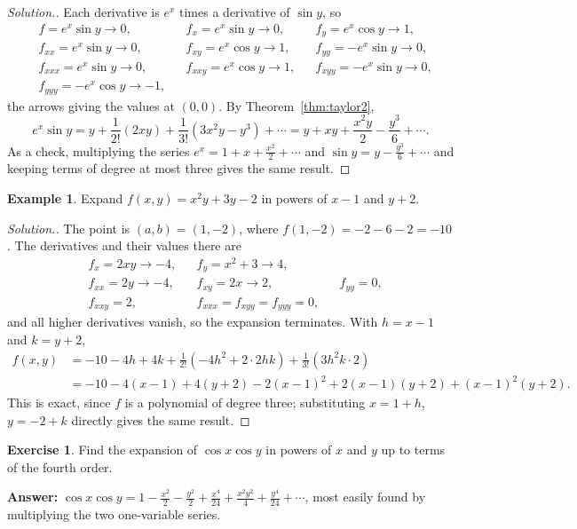 \documentclass[11pt,a4paper]{article}
\theoremstyle{definition}
\newtheorem{exa}[thm]{Example}
\newtheorem{exe}[thm]{Exercise}
\newenvironment{solution}
  {\renewcommand{\qedsymbol}{}\begin{proof}[\textit{Solution}.]}
  {\end{proof}}
\begin{document}
\begin{solution}
Each derivative is $e^x$ times a derivative of $\sin y$, so
\begin{align*}
& f = e^x\sin y \to 0, && f_x = e^x\sin y \to 0, && f_y = e^x\cos y \to 1,\\
& f_{xx} = e^x\sin y \to 0, && f_{xy} = e^x\cos y \to 1, && f_{yy} = -e^x\sin y
\to 0,\\
& f_{xxx} = e^x\sin y \to 0, && f_{xxy} = e^x\cos y \to 1, && f_{xyy} = -e^x\sin y
\to 0,\\
& f_{yyy} = -e^x\cos y \to -1,
\end{align*}
the arrows giving the values at $(0,0)$. By Theorem~\ref{thm:taylor2},
\[e^x\sin y = y + \frac{1}{2!}(2xy) + \frac{1}{3!}(3x^2y - y^3) + \cdots = y + xy
+ \frac{x^2y}{2} - \frac{y^3}{6} + \cdots .\]
As a check, multiplying the series $e^x = 1 + x + \frac{x^2}{2}+\cdots$ and
$\sin y = y - \frac{y^3}{6}+\cdots$ and keeping terms of degree at most three
gives the same result.
\end{solution}

\begin{exa}
\label{ex:taylorpoly}
Expand $f(x,y) = x^2y + 3y -2$ in powers of $x - 1$ and $y + 2$.
\end{exa}

\begin{solution}
The point is $(a,b) = (1,-2)$, where $f(1,-2) = -2 - 6 - 2 = -10$. The
derivatives and their values there are
\begin{align*}
& f_x = 2xy \to -4, && f_y = x^2 + 3 \to 4,\\
& f_{xx} = 2y \to -4, && f_{xy} = 2x \to 2, && f_{yy} = 0,\\
& f_{xxy} = 2, && f_{xxx} = f_{xyy} = f_{yyy} = 0 ,
\end{align*}
and all higher derivatives vanish, so the expansion terminates. With $h = x - 1$
and $k = y + 2$,
\begin{align*}
f(x,y) & = -10 - 4h + 4k + \frac{1}{2!}\left(-4h^2 + 2\cdot 2hk\right) +
\frac{1}{3!}\left(3h^2k\cdot 2\right)\\
& = -10 - 4(x-1) + 4(y+2) - 2(x-1)^2 + 2(x-1)(y+2) + (x-1)^2(y+2) .
\end{align*}
This is exact, since $f$ is a polynomial of degree three; substituting
$x = 1 + h$, $y = -2 + k$ directly gives the same result.
\end{solution}

\begin{exe}
\label{exe:coscos}
Find the expansion of $\cos x \cos y$ in powers of $x$ and $y$ up to terms of the
fourth order.

\textbf{Answer:}
$\cos x\cos y = 1 - \frac{x^2}{2}-\frac{y^2}{2} + \frac{x^4}{24} +
\frac{x^2y^2}{4} + \frac{y^4}{24}+\cdots$, most easily found by multiplying the
two one-variable series.
\end{exe}
\end{document}
